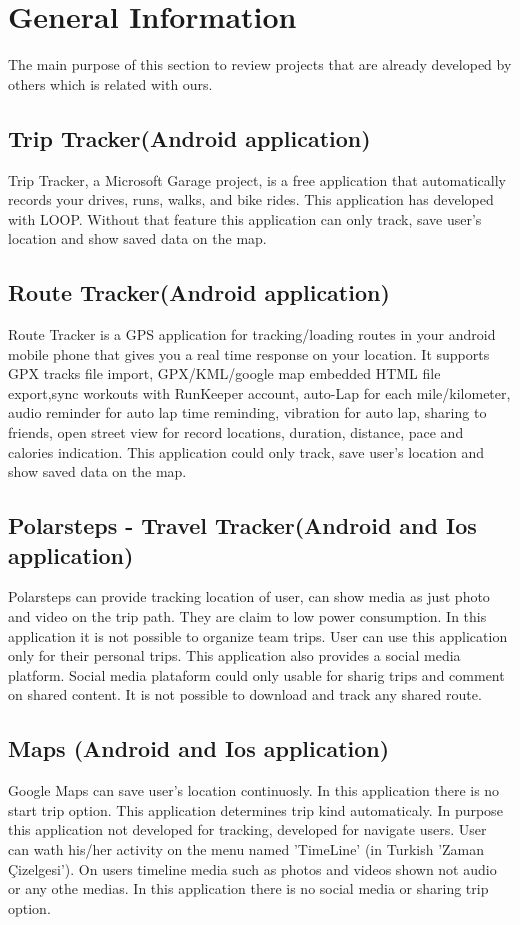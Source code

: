 \chapter{General Information}
The main purpose of this section to review projects that are already developed by others which is related with ours.
\section{Trip Tracker(Android application)}
Trip Tracker\cite{triptracker}, a Microsoft Garage project, is a free application that automatically records your drives, runs, walks, and bike rides. This application has developed with LOOP\cite{loop}. Without that feature this application can only track, save user's location and show saved data on the map.

\section{Route Tracker(Android application)}
Route Tracker\cite{routetracker} is a GPS application for tracking/loading routes in your android mobile phone that gives you a real time response on your location. It supports GPX tracks file import, GPX/KML/google map embedded HTML file export,sync workouts with RunKeeper account, auto-Lap for each mile/kilometer, audio reminder for auto lap time reminding, vibration for auto lap, sharing to friends, open street view for record locations, duration, distance, pace and calories indication. This application could only track, save user's location and show saved data on the map.

\section{Polarsteps - Travel Tracker(Android and Ios application)}
Polarsteps\cite{polarsteps} can provide tracking location of user, can show media as just photo and video on the trip path. They are claim to low power consumption. In this application it is not possible to organize team trips. User can use this application only for their personal trips. This application also provides a social media platform. Social media plataform could only usable for sharig trips and comment on shared content. It is not possible to download and track any shared route.

\section{Maps (Android and Ios application)}
Google Maps\cite{googlemap} can save user's location continuosly. In this application there is no start trip option. This application determines trip kind automaticaly. In purpose this application not developed for tracking, developed for navigate users. User can wath his/her activity on the menu named 'TimeLine' (in Turkish 'Zaman Çizelgesi'). On users timeline media such as photos and videos shown not audio or any othe medias. In this application there is no social media or sharing trip option.

